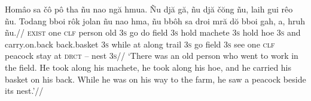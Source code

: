 %
\ex
\hsize=5.8in
\let\\=\textsc
\boxglwords %
\begingl[extraglskip=1ex,aboveglbskip=-.25ex]
\gla
Hom\^{a}o sa \v{c}\^{o} p\^{o} tha  \~{n}u nao ng\u{a} hmua. \~{N}u
dj\u{a} g\u{a}, \~{n}u dj\u{a} \v{c}\u{o}ng \~{n}u, laih gui r\^{e}o
\~{n}u. Todang bboi r\^{o}k jolan \~{n}u nao hma, \~{n}u bb\^{o}h sa
droi mr\u{a} d\u{o} bboi gah, a, hruh \~{n}u.//
\glb
\\{exist} one \\{clf} person old \\{3s} go do field \\{3s} hold
machete \\{3s} hold hoe \\{3s} and carry.on.back back.basket \\{3s}
while at along trail \\{3s} go field \\{3s} see one \\{clf} peacock
stay at \\{drct} -- nest \\{3s}//
\glft
`There was an old person who went to work in the field. He took
along his machete, he took along his hoe, and he carried his
basket on his back. While he was on his way to the farm, he saw a
peacock beside its nest.'//
\endgl
\xe

